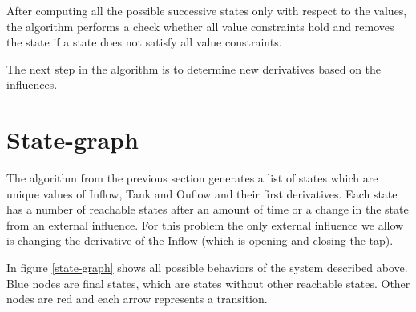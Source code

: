 \documentclass[a4paper]{article}
\begin{document}
After computing all the possible successive states only with respect to the values, the algorithm performs a check whether all value constraints hold and removes the state if a state does not satisfy all value constraints.

The next step in the algorithm is to determine new derivatives based on the influences.
\begin{algorithm}

\caption{}
\label{alg:propogating_influences}
\end{algorithm}

\section{State-graph}
The algorithm from the previous section generates a list of states which are unique values of Inflow, Tank and Ouflow and their first derivatives. Each state has a number of reachable states after an amount of time or a change in the state from an external influence. For this problem the only external influence we allow is changing the derivative of the Inflow (which is opening and closing the tap).

In figure \ref{state-graph} shows all possible behaviors of the system described above. Blue nodes are final states, which are states without other reachable states. Other nodes are red and each arrow represents a transition.
\end{document}

